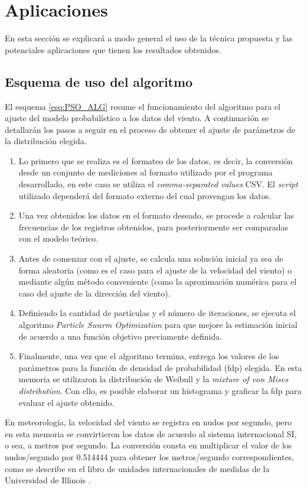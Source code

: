
\chapter{Aplicaciones}
En esta sección se explicará a modo general el uso de la técnica propuesta y las potenciales aplicaciones que tienen los resultados obtenidos.
\section{Esquema de uso del algoritmo}
El esquema \ref{esq:PSO_ALG} resume el funcionamiento del algoritmo para el ajuste del modelo probabilístico a los datos del viento. A continuación se detallarán los pasos a seguir en el proceso de obtener el ajuste de parámetros de la distribución elegida.
\begin{enumerate}
    \item Lo primero que se realiza es el formateo de los datos, es decir, la conversión desde un conjunto de mediciones al formato utilizado por el programa desarrollado, en este caso se utiliza el \emph{comma-separated values} CSV. El \emph{script} utilizado dependerá del formato externo del cual provengan los datos.
    \item Una vez obtenidos los datos en el formato deseado, se procede a calcular las frecuencias de los registros obtenidos, para posteriormente ser comparadas con el modelo teórico.
    \item Antes de comenzar con el ajuste, se calcula una solución inicial ya sea de forma aleatoria (como es el caso para el ajuste de la velocidad del viento) o mediante algún método conveniente (como la aproximación numérica para el caso del ajuste de la dirección del viento).  
    \item Definiendo la cantidad de partículas y el número de iteraciones, se ejecuta el algoritmo \emph{Particle Swarm Optimization} para que mejore la estimación inicial de acuerdo a una función objetivo previamente definida. 
    \item Finalmente, una vez que el algoritmo termina, entrega los valores de los parámetros para la función de densidad de probabilidad (fdp) elegida. En esta memoria se utilizaron la distribución de Weibull y la \emph{mixture of von Mises distribution}. Con ello, es posible elaborar un histograma y graficar la fdp para evaluar el ajuste obtenido.
\end{enumerate}
En meteorología, la velocidad del viento se registra en nudos por segundo, pero en esta memoria se convirtieron los datos de acuerdo al sistema internacional SI, o sea, a metros por segundo. La conversión consta en multiplicar el valor de los nudos/segundo por 0.514444 para obtener los metros/segundo correspondientes, como se describe en el libro de unidades internacionales de medidas de la Universidad de Illinois \cite{KnotsMeterSeconds}.\\
